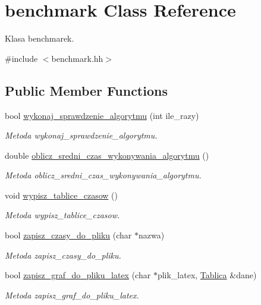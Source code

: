 \hypertarget{classbenchmark}{\section{benchmark Class Reference}
\label{classbenchmark}
}


Klasa benchmarek.  




{\ttfamily \#include $<$benchmark.\+hh$>$}

\subsection*{Public Member Functions}
\begin{DoxyCompactItemize}
\item 
bool \hyperlink{classbenchmark_ab83ffeb122d3cc231acdbf45db4f5ff8}{wykonaj\+\_\+sprawdzenie\+\_\+algorytmu} (int ile\+\_\+razy)
\begin{DoxyCompactList}\small\item\em Metoda wykonaj\+\_\+sprawdzenie\+\_\+algorytmu. \end{DoxyCompactList}\item 
double \hyperlink{classbenchmark_a47af0a6ddc3d1e5afe3324f166ae1292}{oblicz\+\_\+sredni\+\_\+czas\+\_\+wykonywania\+\_\+algorytmu} ()
\begin{DoxyCompactList}\small\item\em Metoda oblicz\+\_\+sredni\+\_\+czas\+\_\+wykonywania\+\_\+algorytmu. \end{DoxyCompactList}\item 
void \hyperlink{classbenchmark_ad2fa742abac2df08a8a3174ca0cd2a09}{wypisz\+\_\+tablice\+\_\+czasow} ()
\begin{DoxyCompactList}\small\item\em Metoda wypisz\+\_\+tablice\+\_\+czasow. \end{DoxyCompactList}\item 
bool \hyperlink{classbenchmark_a452c061a57050dacd3429ad5186b49fe}{zapisz\+\_\+czasy\+\_\+do\+\_\+pliku} (char $\ast$nazwa)
\begin{DoxyCompactList}\small\item\em Metoda zapisz\+\_\+czasy\+\_\+do\+\_\+pliku. \end{DoxyCompactList}\item 
bool \hyperlink{classbenchmark_a880b885f576849cc98ee1ced757cb99d}{zapisz\+\_\+graf\+\_\+do\+\_\+pliku\+\_\+latex} (char $\ast$plik\+\_\+latex, \hyperlink{class_tablica}{Tablica} \&dane)
\begin{DoxyCompactList}\small\item\em Metoda zapisz\+\_\+graf\+\_\+do\+\_\+pliku\+\_\+latex. \end{DoxyCompactList}\end{DoxyCompactItemize}


